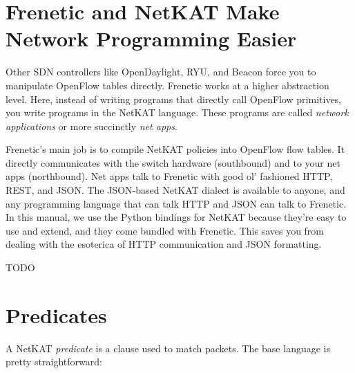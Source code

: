 \section{Frenetic and NetKAT Make Network Programming Easier}

Other SDN controllers like OpenDaylight, RYU, and Beacon force you to manipulate 
OpenFlow tables directly.  
Frenetic works at a higher abstraction level.  
Here, instead of writing programs that directly call OpenFlow primitives, you write programs in 
the NetKAT language.
These programs are called \emph{network applications} or more succinctly \emph{net apps}.

Frenetic's main job is to compile NetKAT policies into OpenFlow flow tables.  
It directly communicates with the switch hardware (southbound) and to your net apps (northbound).
Net apps talk to Frenetic with good ol' fashioned HTTP, REST, and JSON.
The JSON-based NetKAT dialect is available to anyone, and any programming language that can talk HTTP and 
JSON can talk to Frenetic.
In this manual, we use the Python bindings for NetKAT because they're easy to use and extend, and they
come bundled with Frenetic.  
This saves you from dealing with the esoterica of HTTP communication and JSON formatting.  

TODO

\section{Predicates}

A NetKAT \textit{predicate} is a clause used to match packets.
The base language is pretty straightforward:

